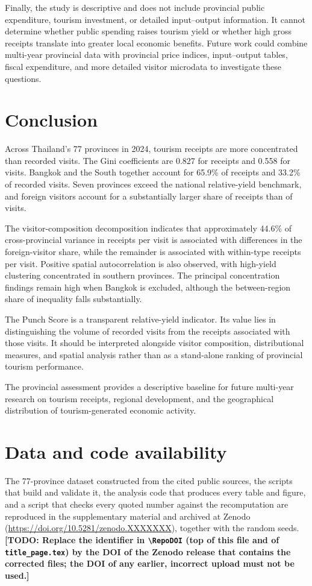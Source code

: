 \documentclass[11pt,a4paper]{article}
\newif\ifdraft \drafttrue
\newcommand{\todo}[1]{\ifdraft{\color{red}\textbf{[TODO: #1]}}\fi}
\newcommand{\RepoDOI}{10.5281/zenodo.XXXXXXX}   %
\begin{document}
Finally, the study is descriptive and does not include provincial public expenditure, tourism investment, or detailed input--output information. It cannot determine whether public spending raises tourism yield or whether high gross receipts translate into greater local economic benefits. Future work could combine multi-year provincial data with provincial price indices, input--output tables, fiscal expenditure, and more detailed visitor microdata to investigate these questions.

\section{Conclusion}
Across Thailand's 77 provinces in 2024, tourism receipts are more concentrated than recorded visits. The Gini coefficients are 0.827 for receipts and 0.558 for visits. Bangkok and the South together account for 65.9\% of receipts and 33.2\% of recorded visits. Seven provinces exceed the national relative-yield benchmark, and foreign visitors account for a substantially larger share of receipts than of visits.

The visitor-composition decomposition indicates that approximately 44.6\% of cross-provincial variance in receipts per visit is associated with differences in the foreign-visitor share, while the remainder is associated with within-type receipts per visit. Positive spatial autocorrelation is also observed, with high-yield clustering concentrated in southern provinces. The principal concentration findings remain high when Bangkok is excluded, although the between-region share of inequality falls substantially.

The Punch Score is a transparent relative-yield indicator. Its value lies in distinguishing the volume of recorded visits from the receipts associated with those visits. It should be interpreted alongside visitor composition, distributional measures, and spatial analysis rather than as a stand-alone ranking of provincial tourism performance.

The provincial assessment provides a descriptive baseline for future multi-year research on tourism receipts, regional development, and the geographical distribution of tourism-generated economic activity.

\section*{Data and code availability}
The 77-province dataset constructed from the cited public sources, the scripts that build and validate it, the analysis code that produces every table and figure, and a script that checks every quoted number against the recomputation are reproduced in the supplementary material and archived at Zenodo (\url{https://doi.org/\RepoDOI}), together with the random seeds. \todo{Replace the identifier in \texttt{\textbackslash RepoDOI} (top of this file and of \texttt{title\_page.tex}) by the DOI of the Zenodo release that contains the corrected files; the DOI of any earlier, incorrect upload must not be used.}
\end{document}
